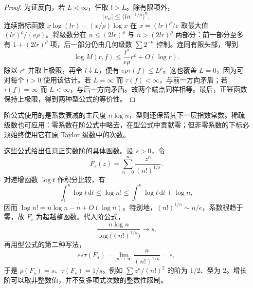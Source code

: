 \begin{proof}
为证反向，若 \(L<\infty\)，任取 \(l>L\)。除有限项外，
\[
 |c_n|\le\bigl(l n^{-1/\rho}\bigr)^n.
\]
连续指标函数 \(x\log(lr)-(x/\rho)\log x\) 在 \(x=(lr)^\rho/e\) 取最大值 \((lr)^\rho/(e\rho)\)。将级数分在 \(n\le(2lr)^\rho\) 与 \(n>(2lr)^\rho\) 两部分：前一部分至多有 \(1+(2lr)^\rho\) 项，后一部分仍由几何级数 \(\sum2^{-n}\) 控制。连同有限头部，得到
\[
 \log M(r,f)\le\frac{l^\rho}{e\rho}r^\rho+O(\log r).
\]
除以 \(r^\rho\) 并取上极限，再令 \(l\downarrow L\)，便有 \(e\rho\tau(f)\le L^\rho\)。这也覆盖 \(L=0\)，因为可对每个 \(l>0\) 使用该估计。若 \(L=\infty\) 而 \(\tau(f)<\infty\)，与前一方向矛盾；若 \(\tau(f)=\infty\) 而 \(L<\infty\)，与后一方向矛盾。故两个端点同样相等。最后，正幂函数保持上极限，得到两种型公式的等价性。
\end{proof}
阶公式使用的是系数衰减的主尺度 \(n\log n\)，型则还保留其下一层指数常数。稀疏级数也可应用：零系数在阶公式中略去，在型公式中贡献零；但非零系数的下标必须始终使用它在原 Taylor 级数中的次数。

\ProseParagraphBreak

这些公式给出任意正实数阶的具体函数。设 \(s>0\)，令
\[
 F_s(z)=\sum_{n=0}^{\infty}\frac{z^n}{(n!)^{1/s}}.
\]
对递增函数 \(\log t\) 作积分比较，有
\[
 \int_1^n\log t\,\mathrm{d}t
 \le\log n!
 \le\int_1^n\log t\,\mathrm{d}t+\log n,
\]
因而 \(\log n!=n\log n-n+O(\log n)\)。特别地，\((n!)^{1/n}\sim n/e\)，系数根趋于零，故 \(F_s\) 为超越整函数。代入阶公式，
\[
 \frac{n\log n}{\log\bigl((n!)^{1/s}\bigr)}\longrightarrow s.
\]
再用型公式的第二种写法，
\[
 e s\tau(F_s)
 =\lim_{n\to\infty}\frac{n}{(n!)^{1/n}}=e,
\]
于是 \(\rho(F_s)=s\)、\(\tau(F_s)=1/s\)。例如 \(\sum z^n/(n!)^2\) 的阶为 \(1/2\)、型为 \(2\)。增长阶可以取非整数值，并不受多项式次数的整数性限制。
